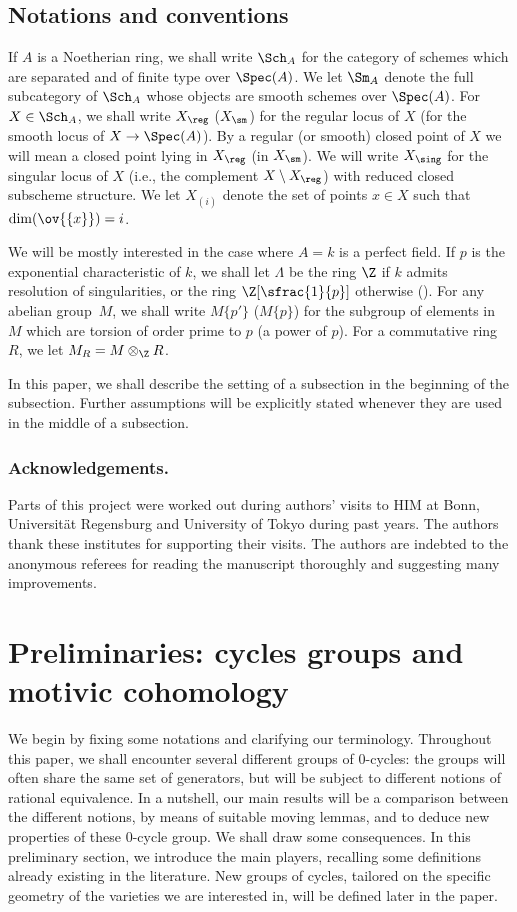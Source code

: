 \subsection*{Notations and conventions}
If $A$ is a Noetherian ring, we shall write $\Sch_A$ for the category
of schemes which are separated and of finite type over $\Spec(A)$.
We let $\Sm_A$ denote the full subcategory of $\Sch_A$ whose objects
are smooth schemes over $\Spec(A)$. For $X\in \Sch_A$, we shall write $X_{\reg}$ (\resp $X_{\sm}$) for the regular locus of $X$ (\resp for the smooth locus of $X\to \Spec(A)$). By a regular (or smooth) closed point of $X$ we will mean a closed point lying in $X_{\reg}$ (\resp in $X_{\sm}$). We will write $X_{\sing}$ for the singular locus of $X$ (i.e., the complement $X \setminus X_{\reg}$) with reduced closed subscheme structure. We let $X_{(i)}$ denote the set of points $x \in X$ such that
$\dim(\ov{\{x\}}) = i$.

We will be mostly interested in the case where $A = k$ is a perfect field.
If $p$ is the exponential characteristic of $k$,
we shall let $\Lambda$ be the ring $\Z$ if $k$ admits resolution of
singularities, or the ring $\Z[\sfrac{1}{p}]$ otherwise (\cite[Def.\,3.4]{FV}).
For any abelian group~$M$, we shall write $M\{p'\}$ (\resp $M\{p\}$) for the subgroup of elements in $M$ which are torsion of order prime to $p$ (\resp a power of $p$). For a commutative ring $R$, we let
$M_R = M \otimes_\Z R$.

In this paper, we shall describe the setting of a subsection in the beginning
of the subsection. Further assumptions will be explicitly stated whenever they are
used in the middle of a subsection.

\subsubsection*{Acknowledgements.}
Parts of this project were worked out during authors' visits to
HIM at Bonn, Universität Regensburg and University of Tokyo
during past years. The authors thank these institutes for supporting their
visits. The authors are indebted to the anonymous referees for reading the manuscript thoroughly and suggesting many improvements.

\section{Preliminaries: cycles groups and
motivic cohomology}\label{sec:set-up}
We begin by fixing some notations and clarifying our terminology.
Throughout this paper, we shall encounter several different groups of $0$-cycles: the groups will often share the same set of generators, but will be subject to different notions of rational equivalence. In a nutshell, our main results will be a comparison between the different notions, by means of suitable moving lemmas, and to deduce new
properties of these $0$-cycle group. We shall draw some consequences.
In this preliminary section, we introduce the main players, recalling some definitions already existing in the literature. New groups of cycles, tailored on the specific geometry of the varieties we are interested in, will be defined later in the paper.

